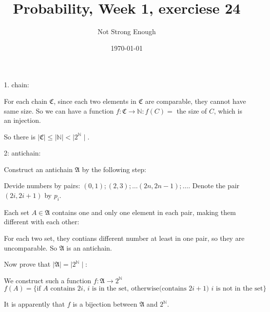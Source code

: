 \documentclass{article}
\title{Probability, Week 1, exerciese 24}
\author{Not Strong Enough}
\date{\today}
\begin{document}
\maketitle

1. chain: 

For each chain $\mathfrak C$, since each two elements in $\mathfrak C$ are comparable, they cannot have same size. 
So we can have a function $f:\mathfrak C\rightarrow\mathbb N:f(C)=$ the size of $C$, which is an injection. 

So there is $\mid\mathfrak C\mid\leq\mid\mathbb N\mid<\mid 2^{\mathbb N}\mid$. 

2: antichain: 

Construct an antichain $\mathfrak A$ by the following step: 

Devide numbers by pairs: $(0, 1);(2, 3);\dots (2n, 2n - 1);\dots$. Denote the pair $(2i, 2i + 1)$ by $p_i$. 

Each set $A\in\mathfrak A$ contains one and only one element in each pair, making them different with each other: 

For each two set, they contians different number at least in one pair, so they are uncomparable. 
So $\mathfrak A$ is an antichain. 

Now prove that $\mid\mathfrak A\mid=\mid2^{\mathbb N}\mid$: 

We construct such a function $f:\mathfrak A\rightarrow 2^{\mathbb N}$
$$f(A)=\{\text{if $A$ contains $2i$, $i$ is in the set, otherwise(contains $2i+1$) $i$ is not in the set}\}$$

It is apparently that $f$ is a bijection between $\mathfrak A$ and $2^{\mathbb N}$. 
\end{document}
